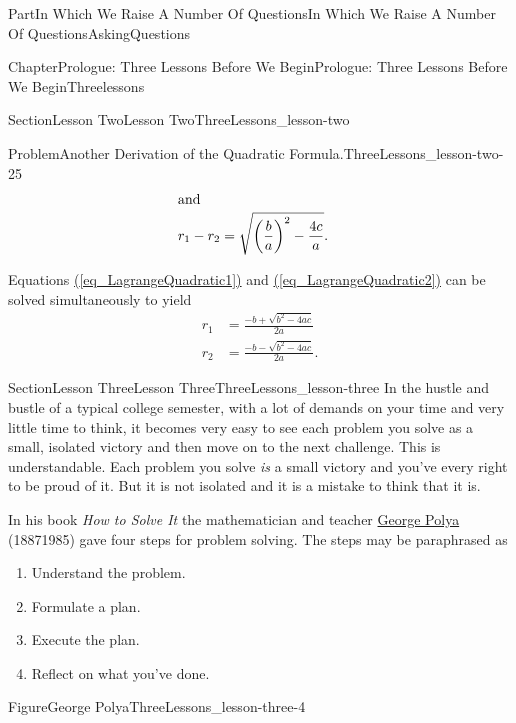 \documentclass[oneside,10pt,]{book}
\newcommand{\xreffont}{\relax}
\numberwithin{equation}{part}
\newcommand{\amp}{&}
\begin{document}
\begin{partptx}{Part}{In Which We Raise A Number Of Questions}{}{In Which We Raise A Number Of Questions}{}{}{AskingQuestions}
\begin{chapterptx}{Chapter}{Prologue: Three Lessons Before We Begin}{}{Prologue: Three Lessons Before We Begin}{}{}{Threelessons}
\begin{sectionptx}{Section}{Lesson Two}{}{Lesson Two}{}{}{ThreeLessons_lesson-two}
\begin{problem}{Problem}{Another Derivation of the Quadratic Formula.}{ThreeLessons_lesson-two-25}
\begin{align}
\intertext{and}
r_1-r_2 \amp = \sqrt{\left(\frac{b}{a}\right)^2-\frac{4c}{a}}\text{.}\label{eq_LagrangeQuadratic2}
\end{align}
%
\par
Equations \hyperref[eq_LagrangeQuadratic1]{({\xreffont\ref{eq_LagrangeQuadratic1}})} and \hyperref[eq_LagrangeQuadratic2]{({\xreffont\ref{eq_LagrangeQuadratic2}})} can be solved simultaneously to yield%
\begin{align*}
r_1\amp =\frac{-b+\sqrt{b^2-4ac}}{2a}\\
r_2\amp =\frac{-b-\sqrt{b^2-4ac}}{2a}\text{.}
\end{align*}
%
\end{problem}
\end{sectionptx}
%
%
\typeout{************************************************}
\typeout{************************************************}
%
\begin{sectionptx}{Section}{Lesson Three}{}{Lesson Three}{}{}{ThreeLessons_lesson-three}
In the hustle and bustle of a typical college semester, with a lot of demands on your time and very little time to think, it becomes very easy to see each problem you solve as a small, isolated victory and then move on to the next challenge.  This is understandable.  Each problem you solve \emph{is} a small victory and you've every right to be proud of it.  But it is not isolated and it is a mistake to think that it is.%
\par
In his book \emph{How to Solve It} the mathematician and teacher \href{https://mathshistory.st-andrews.ac.uk/Biographies/Polya/}{George Polya} (1887\textendash{}1985) gave four steps for problem solving.  The steps may be paraphrased as%
\begin{enumerate}
\item{}Understand the problem.%
\item{}Formulate a plan.%
\item{}Execute the plan.%
\item{}Reflect on what you've done.%
\end{enumerate}
%
\begin{figureptx}{Figure}{George Polya}{ThreeLessons_lesson-three-4}{}%
%
%
\begin{image}{0.325}{0.35}{0.325}{}%

\end{image}
\end{figureptx}
\end{sectionptx}
\end{chapterptx}
\end{partptx}
\end{document}
